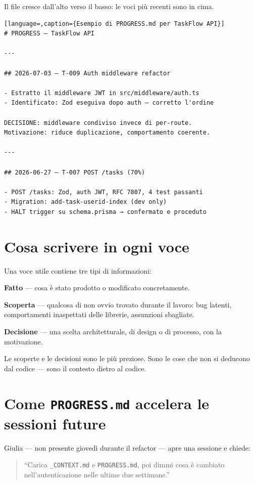 Il file cresce dall'alto verso il basso: le voci più recenti sono in cima.

\begin{lstlisting}[language=,caption={Esempio di PROGRESS.md per TaskFlow API}]
# PROGRESS — TaskFlow API

---

## 2026-07-03 — T-009 Auth middleware refactor

- Estratto il middleware JWT in src/middleware/auth.ts
- Identificato: Zod eseguiva dopo auth — corretto l'ordine

DECISIONE: middleware condiviso invece di per-route.
Motivazione: riduce duplicazione, comportamento coerente.

---

## 2026-06-27 — T-007 POST /tasks (70%)

- POST /tasks: Zod, auth JWT, RFC 7807, 4 test passanti
- Migration: add-task-userid-index (dev only)
- HALT trigger su schema.prisma → confermato e proceduto
\end{lstlisting}

\section{Cosa scrivere in ogni voce}
\label{sec:05-cosa-scrivere}

Una voce utile contiene tre tipi di informazioni:

\textbf{Fatto} --- cosa è stato prodotto o modificato concretamente.

\textbf{Scoperta} --- qualcosa di non ovvio trovato durante il lavoro: bug latenti, comportamenti inaspettati delle librerie, assunzioni sbagliate.

\textbf{Decisione} --- una scelta architetturale, di design o di processo, con la motivazione.

Le scoperte e le decisioni sono le più preziose. Sono le cose che non si deducono dal codice --- sono il contesto dietro al codice.

\section{Come \texttt{PROGRESS.md} accelera le sessioni future}
\label{sec:05-accelerazione}

Giulia --- non presente giovedì durante il refactor --- apre una sessione e chiede:

\begin{quote}
``Carica \texttt{\_CONTEXT.md} e \texttt{PROGRESS.md}, poi dimmi cosa è cambiato nell'autenticazione nelle ultime due settimane.''
\end{quote}


